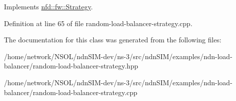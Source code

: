 Implements \hyperlink{classnfd_1_1fw_1_1Strategy_a1193c1881f92b1618a1004f92669eaaa}{nfd\+::fw\+::\+Strategy}.



Definition at line 65 of file random-\/load-\/balancer-\/strategy.\+cpp.



The documentation for this class was generated from the following files\+:\begin{DoxyCompactItemize}
\item 
/home/network/\+N\+S\+O\+L/ndn\+S\+I\+M-\/dev/ns-\/3/src/ndn\+S\+I\+M/examples/ndn-\/load-\/balancer/random-\/load-\/balancer-\/strategy.\+hpp\item 
/home/network/\+N\+S\+O\+L/ndn\+S\+I\+M-\/dev/ns-\/3/src/ndn\+S\+I\+M/examples/ndn-\/load-\/balancer/random-\/load-\/balancer-\/strategy.\+cpp\end{DoxyCompactItemize}
